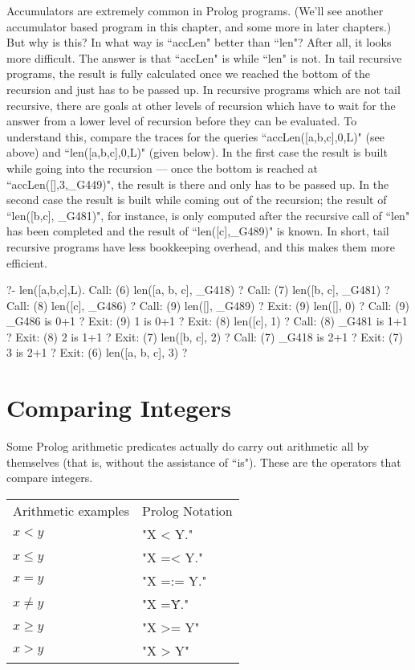 Accumulators are extremely common in Prolog programs.  (We'll see
another accumulator based program in this chapter, and some more in
later chapters.) But why is this? In what way is ``accLen" better than
``len"? After all, it looks more difficult. The answer is that ``accLen"
is  while ``len" is not. In tail recursive
programs, the result is fully calculated once we reached the bottom of
the recursion and just has to be passed up. In recursive programs
which are not tail recursive, there are goals at other levels of
recursion which have to wait for the answer from a lower level of
recursion before they can be evaluated. To understand this, compare
the traces for the queries ``accLen([a,b,c],0,L)" (see above) and
``len([a,b,c],0,L)" (given below). In the first case the result is
built while going into the recursion --- once the bottom is reached at
``accLen([],3,\_G449)", the result is there and only has to be passed
up. In the second case the result is built while coming out of the
recursion; the result of ``len([b,c], \_G481)", for instance, is only
computed after the recursive call of ``len" has been completed and the
result of ``len([c],\_G489)" is known. In short, tail recursive programs
have less bookkeeping overhead, and this makes them more efficient.

\begin{LPNcodedisplay}
?- len([a,b,c],L).
   Call: (6) len([a, b, c], _G418) ?
   Call: (7) len([b, c], _G481) ?
   Call: (8) len([c], _G486) ?
   Call: (9) len([], _G489) ?
   Exit: (9) len([], 0) ?
   Call: (9) _G486 is 0+1 ?
   Exit: (9) 1 is 0+1 ?
   Exit: (8) len([c], 1) ?
   Call: (8) _G481 is 1+1 ?
   Exit: (8) 2 is 1+1 ?
   Exit: (7) len([b, c], 2) ?
   Call: (7) _G418 is 2+1 ?
   Exit: (7) 3 is 2+1 ?
   Exit: (6) len([a, b, c], 3) ?
\end{LPNcodedisplay}


\section{Comparing Integers}\label{SEC.L5.COMPARING-INTEGERS}



Some Prolog arithmetic predicates actually do carry out arithmetic
all by themselves (that is, without the assistance of ``is").
These are the operators that compare integers.

\begin{center}\begin{tabular}{ll}
Arithmetic examples & Prolog Notation\\
$x<y$&"X < Y."\\ \index{PROLOG </2@\texttt{</2}}
$x\le y$&"X =< Y."\\ \index{PROLOG =</2@\texttt{=</2}}
$x=y$&"X =:= Y."\\ \index{PROLOG =:=/2@\texttt{=:=/2}}
$x\not=y$&"X =\= Y."\\ \index{PROLOG =\=/2@\verb-=\=/2-}
$x\ge y$&"X >= Y"\\ \index{PROLOG >=/2@\texttt{>=/2}}
$x>y$&"X > Y" \index{PROLOG >/2@\texttt{>/2}}
\end{tabular}\end{center}

